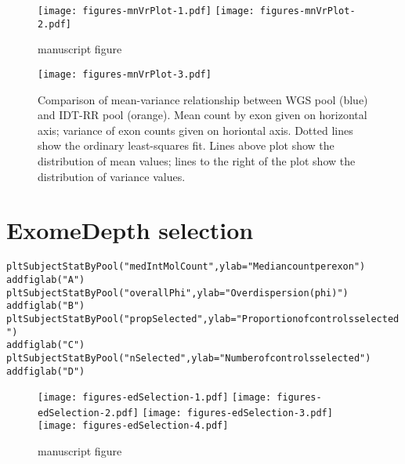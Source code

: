\documentclass{article}\usepackage[]{graphicx}\usepackage[]{color}
\makeatletter
\newcommand{\hlstr}[1]{\textcolor[rgb]{0.063,0.58,0.627}{#1}}%
\newcommand{\hlstd}[1]{\textcolor[rgb]{0.196,0.196,0.196}{#1}}%
\newcommand{\hlkwc}[1]{\textcolor[rgb]{0,0.631,0.314}{#1}}%
\newcommand{\hlkwd}[1]{\textcolor[rgb]{0.78,0.227,0.412}{#1}}%
\newenvironment{kframe}{%
 \def\at@end@of@kframe{}%
 \ifinner\ifhmode%
  \def\at@end@of@kframe{\end{minipage}}%
  \begin{minipage}{\columnwidth}%
 \fi\fi%
 \def\FrameCommand##1{\hskip\@totalleftmargin \hskip-\fboxsep
 \colorbox{shadecolor}{##1}\hskip-\fboxsep
     \hskip-\linewidth \hskip-\@totalleftmargin \hskip\columnwidth}%
 \MakeFramed {\advance\hsize-\width
   \@totalleftmargin\z@ \linewidth\hsize
   \@setminipage}}%
 {\par\unskip\endMakeFramed%
 \at@end@of@kframe}
\newenvironment{knitrout}{}{} %
\makeatother
\begin{document}
\begin{figure}[H]
  \centering
  \texttt{[image: figures-mnVrPlot-1.pdf]}%
  \texttt{[image: figures-mnVrPlot-2.pdf]}
  \caption{manuscript figure}
\end{figure}

\begin{figure}[H]
  \centering
  \texttt{[image: figures-mnVrPlot-3.pdf]}%
  \caption{Comparison of mean-variance relationship between WGS pool (blue) and IDT-RR pool (orange). Mean count by exon given on horizontal axis; variance of exon counts given on horiontal axis. Dotted lines show the ordinary least-squares fit. Lines above plot show the distribution of mean values; lines to the right of the plot show the distribution of variance values.}
\end{figure}

\newpage
\section{ExomeDepth selection}

\begin{knitrout}
\color{fgcolor}\begin{kframe}
\begin{alltt}
\hlkwd{pltSubjectStatByPool}\hlstd{(}\hlstr{"medIntMolCount"}\hlstd{,} \hlkwc{ylab} \hlstd{=} \hlstr{"Median count per exon"}\hlstd{)}
\hlkwd{addfiglab}\hlstd{(}\hlstr{"A"}\hlstd{)}
\hlkwd{pltSubjectStatByPool}\hlstd{(}\hlstr{"overallPhi"}\hlstd{,} \hlkwc{ylab} \hlstd{=} \hlstr{"Overdispersion (phi)"}\hlstd{)}
\hlkwd{addfiglab}\hlstd{(}\hlstr{"B"}\hlstd{)}
\hlkwd{pltSubjectStatByPool}\hlstd{(}\hlstr{"propSelected"}\hlstd{,} \hlkwc{ylab} \hlstd{=} \hlstr{"Proportion of controls selected"}\hlstd{)}
\hlkwd{addfiglab}\hlstd{(}\hlstr{"C"}\hlstd{)}
\hlkwd{pltSubjectStatByPool}\hlstd{(}\hlstr{"nSelected"}\hlstd{,} \hlkwc{ylab} \hlstd{=} \hlstr{"Number of controls selected"}\hlstd{)}
\hlkwd{addfiglab}\hlstd{(}\hlstr{"D"}\hlstd{)}
\end{alltt}
\end{kframe}
\end{knitrout}

\begin{figure}[H]
  \centering
  \texttt{[image: figures-edSelection-1.pdf]}%
  \texttt{[image: figures-edSelection-2.pdf]}
  \texttt{[image: figures-edSelection-3.pdf]}%
  \texttt{[image: figures-edSelection-4.pdf]}
  \caption{manuscript figure}
\end{figure}
\end{document}
